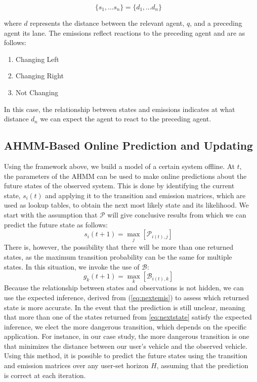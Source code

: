 \documentclass[letterpaper, 10 pt, conference]{ieeeconf}  %
\newcommand\NB[1]{$\spadesuit$\footnote{NB: #1}}
\begin{document}
\begin{equation}
\{s_1,\ldots s_n\} = \{d_1,\ldots d_n\}
\end{equation}

where $d$ represents the distance between the relevant agent, $q$, and a preceding agent its lane. The emissions reflect reactions to the preceding agent and are as follows:
\begin{enumerate}
    \item Changing Left
    \item Changing Right
    \item Not Changing
\end{enumerate}
In this case, the relationship between states and emissions indicates at what distance $d_n$ we can expect the agent to react to the preceding agent.

\subsection{AHMM-Based Online Prediction and Updating} \label{sec:ahmmpredupdate} %
 Using the framework above, we build a model of a certain system offline. At $t$, the parameters of the AHMM can be used to make online predictions about the future states of the observed system. This is done by identifying the current state, $s_{i}(t)$ and applying it to the transition and emission matrices, which are used as lookup tables, to obtain the next most likely state and its likelihood. We start with the assumption that $\mathcal{P}$ will give conclusive results from which we can predict the future state as follows:
\begin{equation} \label{eq:nextstate}
    s_{i}(t+1) = \max_{j}[\mathcal{P}_{i(t),j}]
\end{equation}
There is, however, the possibility that there will be more than one returned states, as the maximum transition probability can be the same for multiple states. In this situation, we invoke the use of $\mathcal{B}$:
\begin{equation} \label{eq:nextemis}
    g_{k}(t+1) = \max_{k}[\mathcal{B}_{i(t),k}]
\end{equation}
Because the relationship between states and observations is not hidden, we can use the expected inference, derived from (\ref{eq:nextemis}) to assess which returned state is more accurate. In the event that the prediction is still unclear, meaning that more than one of the states returned from \ref{eq:nextstate} satisfy the expected inference, we elect the more dangerous transition, which depends on the specific application. For instance, in our case study, the more dangerous transition is one that minimizes the distance between our user's vehicle and the observed vehicle. Using this method, it is possible to predict the future states using the transition and emission matrices over any user-set horizon $H$, assuming that the prediction is correct at each iteration. %
\end{document}
